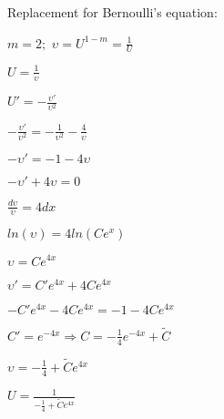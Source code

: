 \documentclass{article}
\begin{document}
Replacement for Bernoulli's equation:
\begin{center}
\begin{spacing}{2.2}
$m=2; $ $\displaystyle \upsilon=U^{1-m}=\frac{1}{U}$

$\displaystyle U=\frac{1}{\upsilon}$

$\displaystyle U'=-\frac{\upsilon'}{\upsilon^2}$

$\displaystyle -\frac{\upsilon'}{\upsilon^2}=-\frac{1}{\upsilon^2}-\frac{4}{\upsilon}$

$-\upsilon'=-1-4\upsilon$

$-\upsilon'+4\upsilon=0$

$\displaystyle \frac{d\upsilon}{\upsilon}=4dx$

$ln(\upsilon)=4ln(Ce^x)$

$\upsilon=Ce^{4x}$

$\upsilon'=C'e^{4x}+4Ce^{4x}$

$-C'e^{4x}-4Ce^{4x}=-1-4Ce^{4x}$

$\displaystyle C'=e^{-4x} \Rightarrow C=-\frac{1}{4}e^{-4x}+\widetilde{C}$

$\displaystyle \upsilon=-\frac{1}{4}+\widetilde{C}e^{4x}$

$\displaystyle U=\frac{1}{-\frac{1}{4}+\widetilde{C}e^{4x}}$

\end{spacing}
\end{center}
\end{document}
